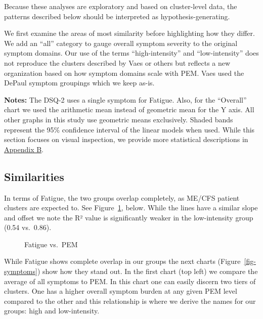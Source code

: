 \documentclass[
  letterpaper,
  DIV=11,
  numbers=noendperiod]{scrartcl}
\begin{document}
Because these analyses are exploratory and based on cluster-level data,
the patterns described below should be interpreted as
hypothesis-generating.

We first examine the areas of most similarity before highlighting how
they differ. We add an ``all'' category to gauge overall symptom
severity to the original symptom domains. Our use of the terms
``high-intensity'' and ``low-intensity'' does not reproduce the clusters
described by Vaes or others but reflects a new organization based on how
symptom domains scale with PEM. Vaes used the DePaul symptom groupings
which we keep as-is.

\textbf{Notes:} The DSQ-2 uses a single symptom for Fatigue. Also, for
the ``Overall'' chart we used the arithmetic mean instead of geometric
mean for the Y axis. All other graphs in this study use geometric means
exclusively. Shaded bands represent the 95\% confidence interval of the
linear models when used. While this section focuses on visual
inspection, we provide more statistical descriptions in
\hyperref[sec-stats]{Appendix B}.

\subsection{Similarities}\label{sec-similar}

In terms of Fatigue, the two groups overlap completely, as ME/CFS
patient clusters are expected to. See Figure~\ref{fig-fatigue}, below.
While the lines have a similar slope and offset we note the R² value is
significantly weaker in the low-intensity group (0.54 vs.~0.86).

\begin{figure}[h]


\caption{\label{fig-fatigue}Fatigue vs.~PEM}

\end{figure}%

\FloatBarrier

While Fatigue shows complete overlap in our groups the next charts
(Figure~\ref{fig-symptoms}) show how they stand out. In the first chart
(top left) we compare the average of all symptoms to PEM. In this chart
one can easily discern two tiers of clusters. One has a higher overall
symptom burden at any given PEM level compared to the other and this
relationship is where we derive the names for our groups: high and
low-intensity.
\end{document}
